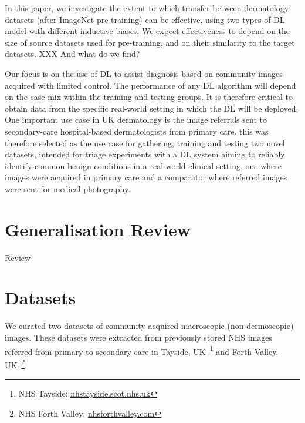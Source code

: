 In this paper, we investigate the extent to which transfer between dermatology datasets (after ImageNet pre-training) can be effective, using two types of DL model with different inductive biases. We expect effectiveness to depend on the size of source datasets used for pre-training, and on their similarity to the target datasets. XXX And what do we find?

Our focus is on the use of DL to assist diagnosis based on community images acquired with limited control. The performance of any DL algorithm will depend on the case mix within the training and testing groups. It is therefore critical to obtain data from the specific real-world setting in which the DL will be deployed. One important use case in UK dermatology is the image referrals sent to secondary-care hospital-based dermatologists from primary care. this was therefore selected as the use case for gathering, training and testing two novel datasets, intended for triage experiments with a DL system aiming to reliably identify common benign conditions in a real-world clinical setting, one where images were acquired in primary care and a comparator where referred images were sent for medical photography. 



\section{Generalisation Review}
\label{sec:generalisation_review}
Review



\section{Datasets}
\label{sec:generalisation_datasets}
We curated two datasets of community-acquired macroscopic (non-dermoscopic) images. These datasets were extracted from previously stored NHS images referred from primary to secondary care in Tayside, UK~\footnote{NHS Tayside: \url{nhstayside.scot.nhs.uk}} and Forth Valley, UK~\footnote{NHS Forth Valley: \url{nhsforthvalley.com}}.

